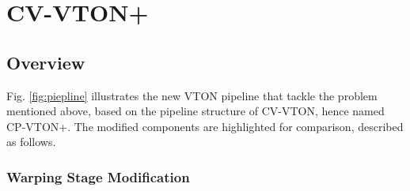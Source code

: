 

\section{CV-VTON+} \label{section:cpvton+}

\subsection{Overview} 

Fig. \ref{fig:piepline} illustrates the new VTON pipeline that tackle the problem mentioned above, based on the pipeline structure of CV-VTON, hence named CP-VTON+. The modified components are highlighted for comparison, described as follows.

\subsubsection{Warping Stage Modification}

